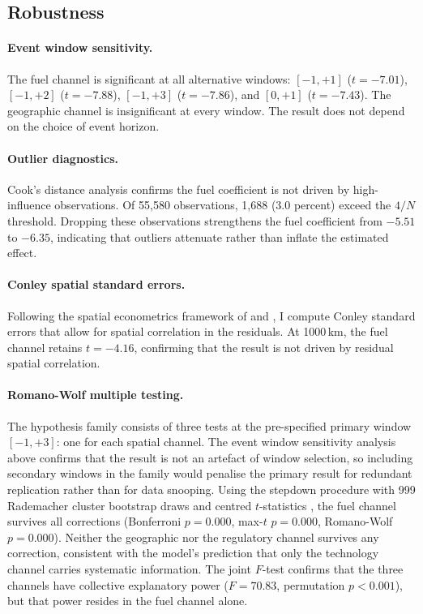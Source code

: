 \documentclass[12pt,a4paper]{article}
\begin{document}
\subsection{Robustness}\label{sec:robustness}

\paragraph{Event window sensitivity.}
The fuel channel is significant at all alternative windows: $[-1, +1]$ ($t = -7.01$), $[-1, +2]$ ($t = -7.88$), $[-1, +3]$ ($t = -7.86$), and $[0, +1]$ ($t = -7.43$). The geographic channel is insignificant at every window. The result does not depend on the choice of event horizon.

\paragraph{Outlier diagnostics.}
Cook's distance analysis confirms the fuel coefficient is not driven by high-influence observations. Of 55{,}580 observations, 1{,}688 (3.0 percent) exceed the $4/N$ threshold. Dropping these observations strengthens the fuel coefficient from $-5.51$ to $-6.35$, indicating that outliers attenuate rather than inflate the estimated effect.

\paragraph{Conley spatial standard errors.}
Following the spatial econometrics framework of \citet{Anselin1988} and \citet{LeSagePace2009}, I compute Conley standard errors that allow for spatial correlation in the residuals. At 1000\,km, the fuel channel retains $t = -4.16$, confirming that the result is not driven by residual spatial correlation.

\paragraph{Romano-Wolf multiple testing.}
The hypothesis family consists of three tests at the pre-specified primary window $[-1, +3]$: one for each spatial channel. The event window sensitivity analysis above confirms that the result is not an artefact of window selection, so including secondary windows in the family would penalise the primary result for redundant replication rather than for data snooping. Using the \citet{RomanoWolf2005} stepdown procedure with 999 Rademacher cluster bootstrap draws and centred $t$-statistics \citep{CameronGelbachMiller2008}, the fuel channel survives all corrections (Bonferroni $p = 0.000$, max-$t$ $p = 0.000$, Romano-Wolf $p = 0.000$). Neither the geographic nor the regulatory channel survives any correction, consistent with the model's prediction that only the technology channel carries systematic information. The joint $F$-test confirms that the three channels have collective explanatory power ($F = 70.83$, permutation $p < 0.001$), but that power resides in the fuel channel alone.
\end{document}

